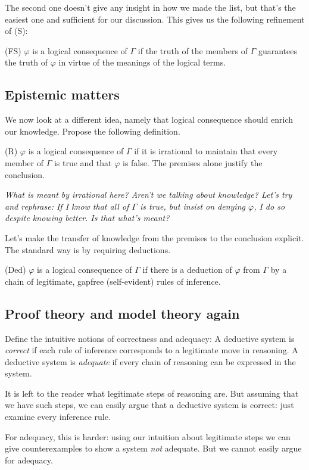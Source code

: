 \documentclass[a4paper]{article}
\begin{document}
The second one doesn't give any insight in how we made the list, but that's
the easiest one and sufficient for our discussion.  This gives us the following
refinement of (S):

(FS) $\varphi$ is a logical consequence of $\Gamma$ if the truth of the members
of $\Gamma$ guarantees the truth of $\varphi$ in virtue of the meanings of the
logical terms.

\subsection{Epistemic matters}

We now look at a different idea, namely that logical consequence should enrich
our knowledge.  Propose the following definition.

(R) $\varphi$ is a logical consequence of $\Gamma$ if it is irrational to
maintain that every member of $\Gamma$ is true and that $\varphi$ is false.  The
premises alone justify the conclusion.

\emph{What is meant by irrational here?  Aren't we talking about knowledge?
Let's try and rephrase:  If I know that all of $\Gamma$ is true, but insist on
denying $\varphi$, I do so despite knowing better.  Is that what's meant?}

Let's make the transfer of knowledge from the premises to the conclusion
explicit.  The standard way is by requiring deductions.

(Ded) $\varphi$ is a logical consequence of $\Gamma$ if there is a deduction of
$\varphi$ from $\Gamma$ by a chain of legitimate, gapfree (self-evident) rules
of inference.

\subsection{Proof theory and model theory again}

Define the intuitive notions of correctness and adequacy: A deductive system is
\emph{correct} if each rule of inference corresponds to a legitimate move in
reasoning.  A deductive system is \emph{adequate} if every chain of reasoning
can be expressed in the system.

It is left to the reader what legitimate steps of reasoning are.  But assuming
that we have such steps, we can easily argue that a deductive system is correct:
just examine every inference rule.

For adequacy, this is harder: using our intuition about legitimate steps we can
give counterexamples to show a system \emph{not} adequate.  But we cannot easily
argue for adequacy.
\end{document}
